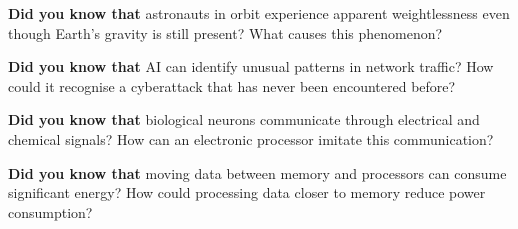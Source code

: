 \clearpage



\begin{center}
\begin{tcolorbox}[colback=SoftYellow, colframe=IEEEblue!70!black, boxrule=0.5pt, arc=0mm, left=3mm, right=3mm, top=1mm, bottom=1mm, width=0.92\textwidth]
\small\RaggedRight \textbf{\color{IEEEblue!75!black}Did you know that} astronauts in orbit experience apparent weightlessness even though Earth's gravity is still present? What causes this phenomenon?
\end{tcolorbox}
\end{center}

\clearpage



\begin{center}
\begin{tcolorbox}[colback=SoftYellow, colframe=IEEEblue!70!black, boxrule=0.5pt, arc=0mm, left=3mm, right=3mm, top=1mm, bottom=1mm, width=0.92\textwidth]
\small\RaggedRight \textbf{\color{IEEEblue!75!black}Did you know that} AI can identify unusual patterns in network traffic? How could it recognise a cyberattack that has never been encountered before?
\end{tcolorbox}
\end{center}

\clearpage



\begin{center}
\begin{tcolorbox}[colback=SoftYellow, colframe=IEEEblue!70!black, boxrule=0.5pt, arc=0mm, left=3mm, right=3mm, top=1mm, bottom=1mm, width=0.92\textwidth]
\small\RaggedRight \textbf{\color{IEEEblue!75!black}Did you know that} biological neurons communicate through electrical and chemical signals? How can an electronic processor imitate this communication?
\end{tcolorbox}
\end{center}

\clearpage



\begin{center}
\begin{tcolorbox}[colback=SoftYellow, colframe=IEEEblue!70!black, boxrule=0.5pt, arc=0mm, left=3mm, right=3mm, top=1mm, bottom=1mm, width=0.92\textwidth]
\small\RaggedRight \textbf{\color{IEEEblue!75!black}Did you know that} moving data between memory and processors can consume significant energy? How could processing data closer to memory reduce power consumption?
\end{tcolorbox}
\end{center}

